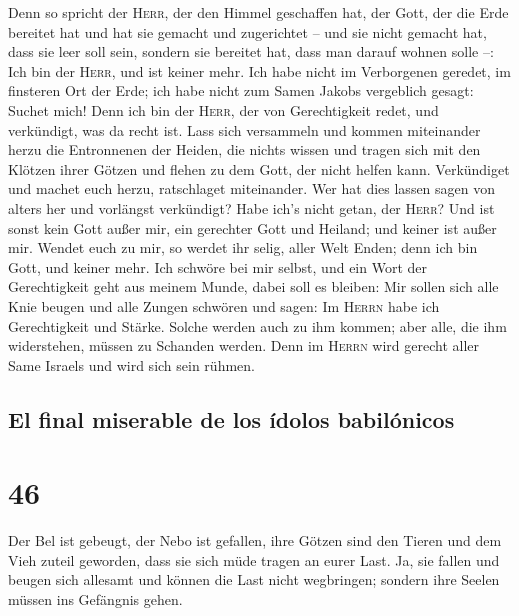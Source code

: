  Denn so spricht der \textsc{Herr}, der den Himmel
geschaffen hat, der Gott, der die Erde bereitet hat und hat sie gemacht
und zugerichtet -- und sie nicht gemacht hat, dass sie leer soll sein,
sondern sie bereitet hat, dass man darauf wohnen solle --: Ich bin der
\textsc{Herr}, und ist keiner mehr.  Ich habe nicht im
Verborgenen geredet, im finsteren Ort der Erde; ich habe nicht zum Samen
Jakobs vergeblich gesagt: Suchet mich! Denn ich bin der \textsc{Herr},
der von Gerechtigkeit redet, und verkündigt, was da recht ist.
 Lass sich versammeln und kommen miteinander herzu die
Entronnenen der Heiden, die nichts wissen und tragen sich mit den
Klötzen ihrer Götzen und flehen zu dem Gott, der nicht helfen kann.
 Verkündiget und machet euch herzu, ratschlaget
miteinander. Wer hat dies lassen sagen von alters her und vorlängst
verkündigt? Habe ich's nicht getan, der \textsc{Herr}? Und ist sonst
kein Gott außer mir, ein gerechter Gott und Heiland; und keiner ist
außer mir.  Wendet euch zu mir, so werdet ihr selig,
aller Welt Enden; denn ich bin Gott, und keiner mehr. 
Ich schwöre bei mir selbst, und ein Wort der Gerechtigkeit geht aus
meinem Munde, dabei soll es bleiben: Mir sollen sich alle Knie beugen
und alle Zungen schwören  und sagen: Im \textsc{Herrn}
habe ich Gerechtigkeit und Stärke. Solche werden auch zu ihm kommen;
aber alle, die ihm widerstehen, müssen zu Schanden werden.
 Denn im \textsc{Herrn} wird gerecht aller Same Israels
und wird sich sein rühmen.

\hypertarget{el-final-miserable-de-los-uxeddolos-babiluxf3nicos}{%
\subsection{El final miserable de los ídolos
babilónicos}\label{el-final-miserable-de-los-uxeddolos-babiluxf3nicos}}

\hypertarget{section-45}{%
\section{46}\label{section-45}}

 Der Bel ist gebeugt, der Nebo ist gefallen, ihre Götzen
sind den Tieren und dem Vieh zuteil geworden, dass sie sich müde tragen
an eurer Last.  Ja, sie fallen und beugen sich allesamt
und können die Last nicht wegbringen; sondern ihre Seelen müssen ins
Gefängnis gehen.

